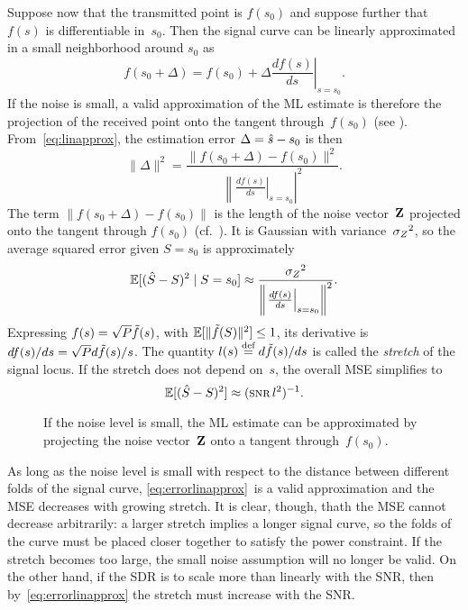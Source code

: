 Suppose now that the transmitted point is $f(s_0)$ and suppose further that
$f(s)$ is differentiable in~$s_0$. Then the signal curve can be linearly
approximated in a small neighborhood around $s_0$ as
\begin{equation}
  \label{eq:linapprox}
  f(s_0 + \Delta) = f(s_0) + \Delta \left. \frac{df(s)}{ds}\right|_{s = s_0}.
\end{equation}
If the noise is small, a valid approximation of the ML estimate is therefore
the projection of the received point onto the tangent through~$f(s_0)$ (see
). From~\eqref{eq:linapprox}, the estimation error $\Delta =
{\hat{s}} - s_0$ is then
\begin{equation*}
  \| \Delta \|^2 = \frac{\| f(s_0 + \Delta) - f(s_0) \|^2}
  {\left\| \left. \frac{d f(s)}{ds} \right|_{s = s_0} \right|^2}.
\end{equation*}
The term $\| f(s_0 + \Delta) - f(s_0) \|$ is the length of the noise
vector~$\mathbf{Z}$ projected onto the tangent through $f(s_0)$
(cf.~). It is Gaussian with variance~${{\sigma_Z}^2}$, so the average
squared error given $S = s_0$ is approximately
\begin{equation}
  \label{eq:errorlinapprox}
  \mathbb{E}[({\hat{S}} - S)^2 \mid S = s_0] \approx \frac{{{\sigma_Z}^2}}{\left\| \left. \frac{df(s)}{ds}
  \right|_{s=s_0} \right\|^2}.
\end{equation}
Expressing $f(s) = \sqrt{P} \tilde{f}(s)$, with $\mathbb{E}[\|\tilde{f}(S)\|^2] \le 1$, its
derivative is
$df(s)/ds = \sqrt{P} d\tilde{f}(s)/s$. The quantity $l(s) \stackrel{\text{def}}{=} d\tilde{f}(s)/ds$ is called
the \emph{stretch} of the signal locus. If the stretch does not depend on~$s$,
the overall MSE simplifies to
\begin{equation}
  \label{eq:constantstretch}
  \mse \approx (\snr l^2)^{-1}.
\end{equation}

\begin{figure}
  \begin{center}
    
  \end{center}
  \caption{If the noise level is small, the ML estimate can be approximated
  by projecting the noise vector~$\mathbf{Z}$ onto a tangent through~$f(s_0)$.}
  \label{fig:tangentproj}
\end{figure}

As long as the noise level is small with respect to the distance between
different folds of the signal curve, \eqref{eq:errorlinapprox}~is a valid
approximation and the MSE decreases with growing stretch. It is clear, though,
thath the MSE cannot decrease arbitrarily: a larger stretch implies a longer
signal curve, so the folds of the curve must be placed closer together to
satisfy the power constraint. If the stretch becomes too large, the small noise
assumption will no longer be valid.  On the other hand, if the SDR is to scale
more than linearly with the SNR, then by~\eqref{eq:errorlinapprox} the stretch
must increase with the SNR.

